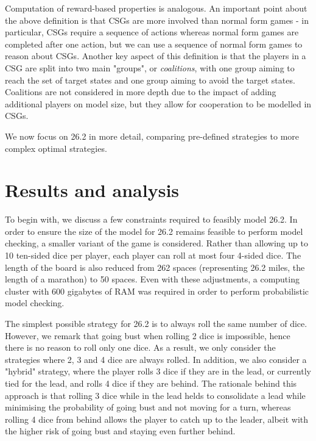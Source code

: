 Computation of reward-based properties is analogous. An important point about the above definition is that CSGs are more involved than normal form games - in particular, CSGs require a sequence of actions whereas normal form games are completed after one action, but we can use a sequence of normal form games to reason about CSGs. Another key aspect of this definition is that the players in a CSG are split into two main "groups", or \emph{coalitions}, with one group aiming to reach the set of target states and one group aiming to avoid the target states. Coalitions are not considered in more depth due to the impact of adding additional players on model size, but they allow for cooperation to be modelled in CSGs.

We now focus on 26.2 in more detail, comparing pre-defined strategies to more complex optimal strategies.

\section{Results and analysis}

To begin with, we discuss a few constraints required to feasibly model 26.2. In order to ensure the size of the model for 26.2 remains feasible to perform model checking, a smaller variant of the game is considered. Rather than allowing up to 10 ten-sided dice per player, each player can roll at most four 4-sided dice. The length of the board is also reduced from 262 spaces (representing 26.2 miles, the length of a marathon) to 50 spaces. Even with these adjustments, a computing cluster with 600 gigabytes of RAM was required in order to perform probabilistic model checking.

The simplest possible strategy for 26.2 is to always roll the same number of dice. However, we remark that going bust when rolling 2 dice is impossible, hence there is no reason to roll only one dice. As a result, we only consider the strategies where 2, 3 and 4 dice are always rolled. In addition, we also consider a "hybrid" strategy, where the player rolls 3 dice if they are in the lead, or currently tied for the lead, and rolls 4 dice if they are behind. The rationale behind this approach is that rolling 3 dice while in the lead helds to consolidate a lead while minimising the probability of going bust and not moving for a turn, whereas rolling 4 dice from behind allows the player to catch up to the leader, albeit with the higher risk of going bust and staying even further behind. 

